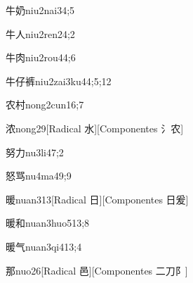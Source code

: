 \begin{verbete}{牛奶}{niu2nai3}{4;5}
\end{verbete}

\begin{verbete}{牛人}{niu2ren2}{4;2}
\end{verbete}

\begin{verbete}{牛肉}{niu2rou4}{4;6}
\end{verbete}

\begin{verbete}{牛仔裤}{niu2zai3ku4}{4;5;12}
\end{verbete}

\begin{verbete}{农村}{nong2cun1}{6;7}
\end{verbete}

\begin{verbete}{浓}{nong2}{9}[Radical 水][Componentes 氵农]
\end{verbete}

\begin{verbete}{努力}{nu3li4}{7;2}
\end{verbete}

\begin{verbete}{怒骂}{nu4ma4}{9;9}
\end{verbete}

\begin{verbete}{暖}{nuan3}{13}[Radical 日][Componentes 日爰]
\end{verbete}

\begin{verbete}{暖和}{nuan3huo5}{13;8}
\end{verbete}

\begin{verbete}{暖气}{nuan3qi4}{13;4}
\end{verbete}

\begin{verbete}{那}{nuo2}{6}[Radical 邑][Componentes 二刀阝]
\end{verbete}

